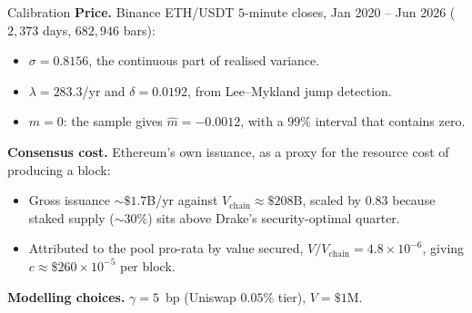 \documentclass[10pt,xcolor=x11names,aspectratio=169]{beamer}
\newcommand{\1}{\mathbf{1}}
\begin{document}
\begin{frame}{Calibration}
  \textbf{Price.} Binance ETH/USDT $5$-minute closes, Jan 2020 -- Jun 2026
  ($2{,}373$ days, $682{,}946$ bars):
  \begin{itemize}
    \item $\sigma = 0.8156$, the continuous part of realised variance.
    \item $\lambda = 283.3$/yr and $\delta = 0.0192$, from Lee--Mykland jump
          detection.
    \item $m = 0$: the sample gives $\hat m = -0.0012$, with a $99\%$ interval
          that contains zero.
  \end{itemize}
  \medskip

  \textbf{Consensus cost.} Ethereum's own issuance, as a proxy for the resource
  cost of producing a block:
  \begin{itemize}
    \item Gross issuance ${\sim}\$1.7$B/yr against $V_{\text{chain}} \approx
          \$208$B, scaled by $0.83$ because staked supply (${\sim}30\%$) sits
          above Drake's security-optimal quarter.
    \item Attributed to the pool pro-rata by value secured,
          $V/V_{\text{chain}} = 4.8\times10^{-6}$, giving
          $c \approx \$260\times10^{-5}$ per block.
  \end{itemize}
  \medskip
  
  \textbf{Modelling choices.} $\gamma = 5$~bp (Uniswap $0.05\%$ tier),
  $V = \$1$M.
\end{frame}
\end{document}
